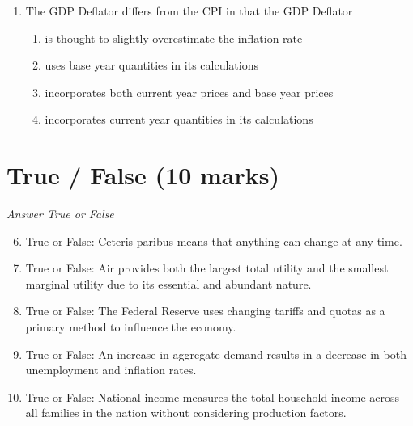 \documentclass[12pt]{article}
\begin{document}
\begin{enumerate}[label=\arabic*.]
\begin{enumerate}[label=(\alph*)]
    \item the United States to be a net exporter of copper.
    \item the United States to impose a tariff on imported copper to protect domestic producers.
    \item the demand for U.S. copper to fall.
    \item a growing trade deficit in the United States in goods and services.
\end{enumerate}
\item The GDP Deflator differs from the CPI in that the GDP Deflator
\begin{enumerate}[label=(\alph*)]
    \item is thought to slightly overestimate the inflation rate
    \item uses base year quantities in its calculations
    \item incorporates both current year prices and base year prices
    \item incorporates current year quantities in its calculations
\end{enumerate}
\end{enumerate}

\section*{True / False (10 marks)}
\textit{Answer True or False}
\begin{enumerate}[label=\arabic*.]
\setcounter{enumi}{5}
\item True or False: Ceteris paribus means that anything can change at any time.
\item True or False: Air provides both the largest total utility and the smallest marginal utility due to its essential and abundant nature.
\item True or False: The Federal Reserve uses changing tariffs and quotas as a primary method to influence the economy.
\item True or False: An increase in aggregate demand results in a decrease in both unemployment and inflation rates.
\item True or False: National income measures the total household income across all families in the nation without considering production factors.
\end{enumerate}
\end{document}
